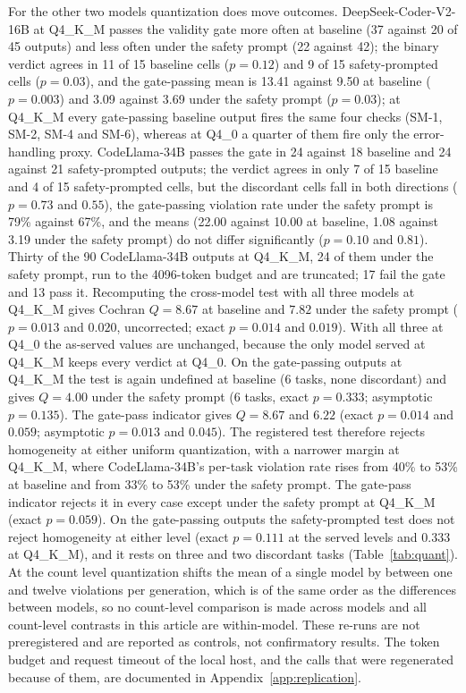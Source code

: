 \documentclass{ieeeaccess}
\begin{document}
For the other two models quantization does move outcomes. DeepSeek-Coder-V2-16B at
Q4\_K\_M passes the validity gate more often at baseline (37 against 20 of 45 outputs) and
less often under the safety prompt (22 against 42); the binary verdict agrees in 11 of 15
baseline cells ($p = 0.12$) and 9 of 15 safety-prompted cells ($p = 0.03$), and the
gate-passing mean is 13.41 against 9.50 at baseline ($p = 0.003$) and 3.09 against 3.69
under the safety prompt ($p = 0.03$); at Q4\_K\_M every gate-passing baseline output fires
the same four checks (SM-1, SM-2, SM-4 and SM-6), whereas at Q4\_0 a quarter of them fire
only the error-handling proxy. CodeLlama-34B passes the gate in 24 against 18 baseline and
24 against 21 safety-prompted outputs; the verdict agrees in only 7 of 15 baseline and 4 of
15 safety-prompted cells, but the discordant cells fall in both directions ($p = 0.73$ and
$0.55$), the gate-passing violation rate under the safety prompt is 79\% against 67\%, and
the means (22.00 against 10.00 at baseline, 1.08 against 3.19 under the safety prompt) do
not differ significantly ($p = 0.10$ and $0.81$). Thirty of the 90 CodeLlama-34B outputs at
Q4\_K\_M, 24 of them under the safety prompt, run to the 4096-token budget and are
truncated; 17 fail the gate and 13 pass it. Recomputing the cross-model test with all
three models at Q4\_K\_M gives Cochran $Q = 8.67$ at baseline and $7.82$ under the safety
prompt ($p = 0.013$ and $0.020$, uncorrected; exact $p = 0.014$ and $0.019$). With all three
at Q4\_0 the as-served
values are unchanged, because the only model served at Q4\_K\_M keeps every verdict at
Q4\_0. On the gate-passing outputs at Q4\_K\_M the test is again undefined at baseline (6
tasks, none discordant) and gives $Q = 4.00$ under the safety prompt (6 tasks, exact
$p = 0.333$; asymptotic $p = 0.135$). The gate-pass indicator gives $Q = 8.67$ and $6.22$
(exact $p = 0.014$ and $0.059$; asymptotic $p = 0.013$ and $0.045$). The registered test therefore rejects homogeneity at either uniform
quantization, with a narrower margin at Q4\_K\_M, where CodeLlama-34B's per-task violation
rate rises from 40\% to 53\% at baseline and from 33\% to 53\% under the safety prompt.
The gate-pass indicator rejects it in every case except under the safety prompt at Q4\_K\_M
(exact $p = 0.059$). On the gate-passing outputs the safety-prompted test does not reject
homogeneity at either level (exact $p = 0.111$ at the served levels and $0.333$ at
Q4\_K\_M), and it rests on three and two discordant tasks (Table~\ref{tab:quant}). At the count level quantization shifts the mean of a
single model by between one and twelve violations per generation, which is of the same
order as the differences between models, so no count-level comparison is made across
models and all count-level contrasts in this article are within-model. These re-runs are
not preregistered and are reported as controls, not confirmatory results. The token
budget and request timeout of the local host, and the calls that were regenerated because
of them, are documented in Appendix~\ref{app:replication}.
\end{document}
